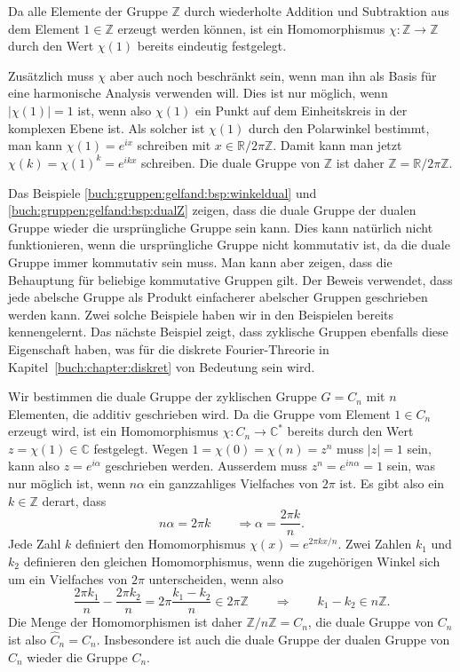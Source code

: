 \begin{beispiel}
\label{buch:gruppen:gelfand:bsp:dualZ}
Da alle Elemente der Gruppe $\mathbb{Z}$ durch wiederholte Addition 
und Subtraktion aus dem Element $1\in\mathbb{Z}$ erzeugt werden können,
ist ein Homomorphismus $\chi\colon \mathbb{Z}\to\mathbb{Z}$ durch
den Wert $\chi(1)$ bereits eindeutig festgelegt.

Zusätzlich muss $\chi$ aber auch noch beschränkt sein, wenn man ihn
als Basis für eine harmonische Analysis verwenden will.
Dies ist nur möglich, wenn $|\chi(1)|=1$ ist, wenn also $\chi(1)$
ein Punkt auf dem Einheitskreis in der komplexen Ebene ist.
Als solcher ist $\chi(1)$ durch den Polarwinkel bestimmt, man kann
$\chi(1)=e^{ix}$ schreiben mit $x\in\mathbb{R}/2\pi\mathbb{Z}$.
Damit kann man jetzt $\chi(k)=\chi(1)^k = e^{ikx}$ schreiben.
Die duale Gruppe von $\mathbb{Z}$ ist daher
$\hat{\mathbb{Z}} = \mathbb{R}/2\pi \mathbb{Z}$.
\end{beispiel}

Das Beispiele
\ref{buch:gruppen:gelfand:bsp:winkeldual}
und
\ref{buch:gruppen:gelfand:bsp:dualZ}
zeigen, dass die duale Gruppe der dualen Gruppe wieder die ursprüngliche
Gruppe sein kann.
Dies kann natürlich nicht funktionieren, wenn die ursprüngliche Gruppe
nicht kommutativ ist, da die duale Gruppe immer kommutativ sein muss.
Man kann aber zeigen, dass die Behauptung für beliebige kommutative
Gruppen gilt.
Der Beweis verwendet, dass jede abelsche Gruppe als Produkt einfacherer
abelscher Gruppen geschrieben werden kann.
Zwei solche Beispiele haben wir in den Beispielen bereits kennengelernt.
Das nächste Beispiel zeigt, dass zyklische Gruppen ebenfalls diese Eigenschaft
haben, was für die diskrete Fourier-Threorie in
Kapitel~\ref{buch:chapter:diskret} von Bedeutung sein wird.

\begin{beispiel}
Wir bestimmen die duale Gruppe der zyklischen Gruppe $G=C_n$ mit $n$
Elementen, die additiv geschrieben wird.
Da die Gruppe vom Element $1\in C_n$ erzeugt wird, ist
ein Homomorphismus $\chi\colon C_n\to\mathbb{C}^*$ bereits durch den
Wert $z=\chi(1)\in\mathbb{C}$ festgelegt.
Wegen $1=\chi(0)=\chi(n)=z^n$ muss $|z|=1$ sein, kann also $z=e^{i\alpha}$
geschrieben werden.
Ausserdem muss $z^n=e^{in\alpha}=1$ sein, was nur möglich ist, wenn
$n\alpha$ ein ganzzahliges Vielfaches von $2\pi$ ist.
Es gibt also ein $k\in \mathbb{Z}$ derart, dass 
\[
n\alpha = 2\pi k
\qquad
\Rightarrow
\alpha = \frac{2\pi k}{n}.
\]
Jede Zahl $k$ definiert den Homomorphismus $\chi(x) = e^{2\pi kx/n}$.
Zwei Zahlen $k_1$ und $k_2$ definieren den gleichen Homomorphismus,
wenn die zugehörigen Winkel sich um ein Vielfaches von $2\pi$ unterscheiden,
wenn also
\[
\frac{2\pi k_1}{n} - \frac{2\pi k_2}{n}
=
2\pi\frac{k_1-k_2}{n}
\in
2\pi \mathbb{Z}
\qquad\Rightarrow\qquad
k_1-k_2
\in
n\mathbb{Z}.
\]
Die Menge der Homomorphismen ist daher $\mathbb{Z}/n\mathbb{Z}=C_n$,
die duale Gruppe von $C_n$ ist also $\hat{C}_n=C_n$.
Insbesondere ist auch die duale Gruppe der dualen Gruppe von $C_n$ 
wieder die Gruppe $C_n$.
\end{beispiel}


